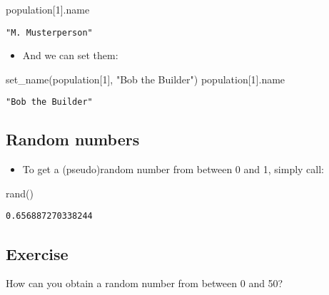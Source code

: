 \documentclass[
  letterpaper,
  DIV=11,
  numbers=noendperiod]{scrartcl}
\newenvironment{Shaded}{\begin{snugshade}}{\end{snugshade}}
\newcommand{\FloatTok}[1]{\textcolor[rgb]{0.68,0.00,0.00}{#1}}
\newcommand{\FunctionTok}[1]{\textcolor[rgb]{0.28,0.35,0.67}{#1}}
\newcommand{\NormalTok}[1]{\textcolor[rgb]{0.00,0.23,0.31}{#1}}
\newcommand{\StringTok}[1]{\textcolor[rgb]{0.13,0.47,0.30}{#1}}
\providecommand{\tightlist}{%
  \setlength{\itemsep}{0pt}\setlength{\parskip}{0pt}}\usepackage{longtable,booktabs,array}
\begin{document}
\begin{Shaded}
\begin{Highlighting}[]
\NormalTok{population[}\FloatTok{1}\NormalTok{].name}
\end{Highlighting}
\end{Shaded}

\begin{verbatim}
"M. Musterperson"
\end{verbatim}

\begin{itemize}
\tightlist
\item
  And we can set them:
\end{itemize}

\begin{Shaded}
\begin{Highlighting}[]
\FunctionTok{set\_name}\NormalTok{(population[}\FloatTok{1}\NormalTok{], }\StringTok{"Bob the Builder"}\NormalTok{)}
\NormalTok{population[}\FloatTok{1}\NormalTok{].name}
\end{Highlighting}
\end{Shaded}

\begin{verbatim}
"Bob the Builder"
\end{verbatim}

\subsection{Random numbers}\label{random-numbers}

\begin{itemize}
\tightlist
\item
  To get a (pseudo)random number from between 0 and 1, simply call:
\end{itemize}

\begin{Shaded}
\begin{Highlighting}[]
\FunctionTok{rand}\NormalTok{()}
\end{Highlighting}
\end{Shaded}

\begin{verbatim}
0.656887270338244
\end{verbatim}

\subsection{Exercise}\label{exercise-4}

How can you obtain a random number from between 0 and 50?
\end{document}
